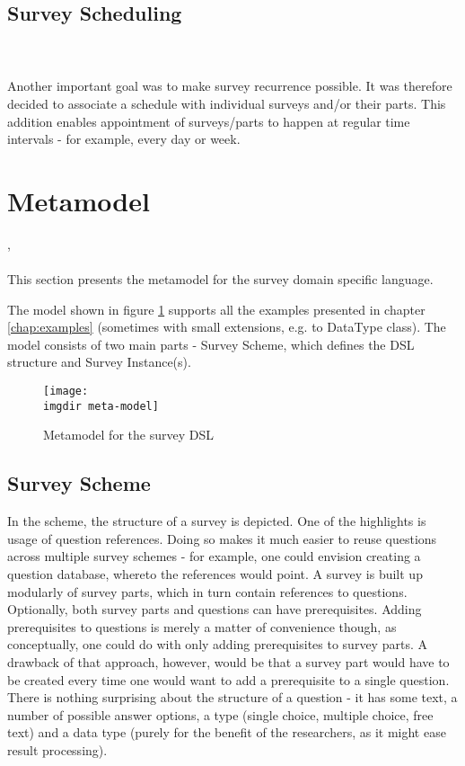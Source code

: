 \subsection{Survey Scheduling}
\label{subsec:scheduling}
\anna \\\\
Another important goal was to make survey recurrence possible. It was therefore decided to associate a schedule with individual surveys and/or their parts. This addition enables appointment of surveys/parts to happen at regular time intervals - for example, every day or week.
\newpage

\section{Metamodel}
\label{sec:metamodel}
\anna , \piotr \\\\
This section presents the metamodel for the survey domain specific language.  

The model shown in figure \ref{fig:metamodel} supports all the examples presented in chapter \ref{chap:examples} (sometimes with small extensions, e.g. to DataType class).
The model consists of two main parts - Survey Scheme, which defines the DSL structure and Survey Instance(s).

\begin{figure}[!htbp]
  \texttt{[image: \\imgdir meta-model]}
  \caption{Metamodel for the survey DSL}
  \label{fig:metamodel}
\end{figure}

\subsection{Survey Scheme}
\label{subsec:surveyscheme}
In the scheme, the structure of a survey is depicted. One of the highlights is usage of question references. Doing so makes it much easier to reuse questions across multiple survey schemes - for example, one could envision creating a question database, whereto the references would point.
A survey is built up modularly of survey parts, which in turn contain references to questions. Optionally, both survey parts and questions can have prerequisites. Adding prerequisites to questions is merely a matter of convenience though, as conceptually, one could do with only adding prerequisites to survey parts. A drawback of that approach, however, would be that a survey part would have to be created every time one would want to add a prerequisite to a single question.
There is nothing surprising about the structure of a question - it has some text, a number of possible answer options, a type (single choice, multiple choice, free text) and a data type (purely for the benefit of the researchers, as it might ease result processing).

